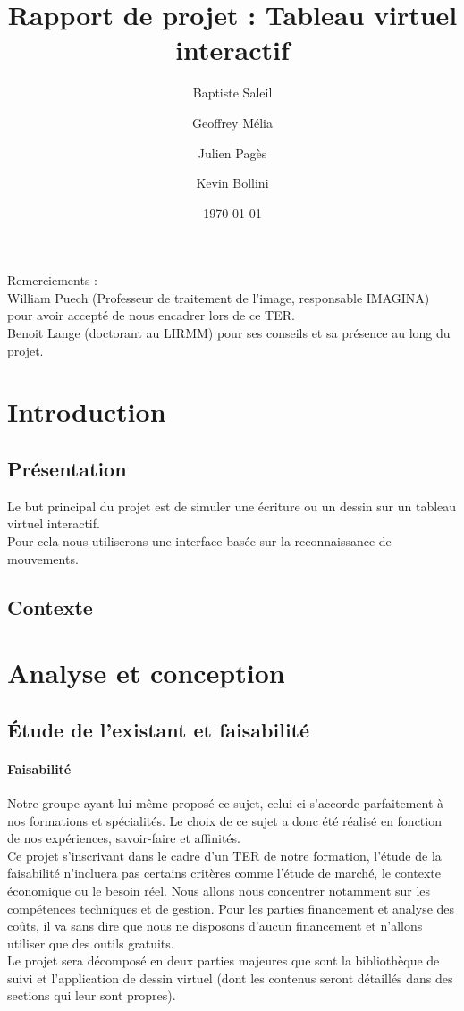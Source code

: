 \documentclass{report}
\title{Rapport de projet : Tableau virtuel interactif}
\author{Baptiste Saleil \and Geoffrey Mélia \and Julien Pagès \and Kevin Bollini}
\date{\today}
\begin{document}
	\maketitle
	\thispagestyle{empty}
	\newpage
	
	\tableofcontents

	\listoffigures
	
	\newpage 
	Remerciements : \\
	
	William Puech (Professeur de traitement de l'image, responsable IMAGINA) pour avoir accepté de nous encadrer lors de ce TER. \\
	Benoit Lange (doctorant au LIRMM) pour ses conseils et sa présence au long du projet. \\
	\newpage
	\chapter{Introduction}
		\section{Présentation}
		Le but principal du projet est de simuler une écriture ou un dessin sur un tableau virtuel interactif. \\
		Pour cela nous utiliserons une interface basée sur la reconnaissance de mouvements.
		
		\section{Contexte}
	
	\chapter{Analyse et conception}
		\section{Étude de l'existant et faisabilité}
		\subsubsection{Faisabilité}
		Notre groupe ayant lui-même proposé ce sujet, celui-ci s'accorde parfaitement à nos formations et spécialités. Le choix de ce sujet a donc été réalisé en fonction de nos expériences, savoir-faire et affinités.\\
Ce projet s'inscrivant dans le cadre d'un TER de notre formation, l'étude de la faisabilité n'incluera pas certains critères comme l'étude de marché, le contexte économique ou le besoin réel. 
Nous allons nous concentrer notamment sur les compétences techniques et de gestion. Pour les parties financement et analyse des coûts, il va sans dire que nous ne disposons d'aucun financement et n'allons utiliser que des outils gratuits. \\
Le projet sera décomposé en deux parties majeures que sont la bibliothèque de suivi et l'application de dessin virtuel (dont les contenus seront détaillés dans des sections qui leur sont propres).
\end{document}

